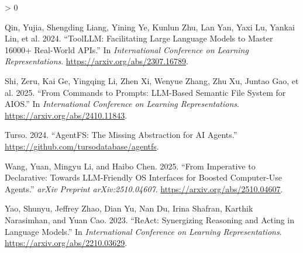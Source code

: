 \documentclass[
  11pt,
]{article}
\newlength{\cslhangindent}
\newenvironment{CSLReferences}[2] %
 {%
  \setlength{\parindent}{0pt}
  \ifodd #1 \everypar{\setlength{\hangindent}{\cslhangindent}}\ignorespaces\fi
  \ifnum #2 > 0
  \setlength{\parskip}{#2\baselineskip}
  \fi
 }%
 {}
\begin{document}
\begin{CSLReferences}{1}{0}
\leavevmode{}%
Qin, Yujia, Shengding Liang, Yining Ye, Kunlun Zhu, Lan Yan, Yaxi Lu,
Yankai Lin, et al. 2024. {``{ToolLLM}: Facilitating Large Language
Models to Master 16000+ Real-World {APIs}.''} In \emph{International
Conference on Learning Representations}.
\url{https://arxiv.org/abs/2307.16789}.

\leavevmode{}%
Shi, Zeru, Kai Ge, Yingqing Li, Zhen Xi, Wenyue Zhang, Zhu Xu, Juntao
Gao, et al. 2025. {``From Commands to Prompts: {LLM}-Based Semantic File
System for {AIOS}.''} In \emph{International Conference on Learning
Representations}. \url{https://arxiv.org/abs/2410.11843}.

\leavevmode{}%
Turso. 2024. {``{AgentFS}: The Missing Abstraction for {AI} Agents.''}
\url{https://github.com/tursodatabase/agentfs}.

\leavevmode{}%
Wang, Yuan, Mingyu Li, and Haibo Chen. 2025. {``From Imperative to
Declarative: Towards {LLM}-Friendly {OS} Interfaces for Boosted
Computer-Use Agents.''} \emph{arXiv Preprint arXiv:2510.04607}.
\url{https://arxiv.org/abs/2510.04607}.

\leavevmode{}%
Yao, Shunyu, Jeffrey Zhao, Dian Yu, Nan Du, Irina Shafran, Karthik
Narasimhan, and Yuan Cao. 2023. {``{ReAct}: Synergizing Reasoning and
Acting in Language Models.''} In \emph{International Conference on
Learning Representations}. \url{https://arxiv.org/abs/2210.03629}.

\end{CSLReferences}
\end{document}
